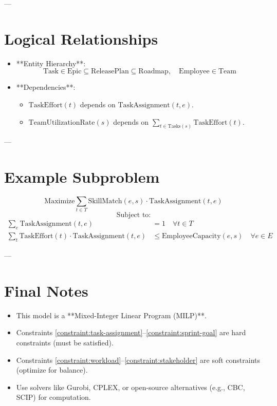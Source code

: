 \documentclass{article}
\begin{document}
---

\section{Logical Relationships}
\begin{itemize}
    \item **Entity Hierarchy**:
    $$
    \text{Task} \in \text{Epic} \subseteq \text{ReleasePlan} \subseteq \text{Roadmap}, \quad \text{Employee} \in \text{Team}
    $$
    \item **Dependencies**:
    \begin{itemize}
        \item $\text{TaskEffort}(t)$ depends on $\text{TaskAssignment}(t, e)$.
        \item $\text{TeamUtilizationRate}(s)$ depends on $\sum_{t \in \text{Tasks}(s)} \text{TaskEffort}(t)$.
    \end{itemize}
\end{itemize}

---

\section{Example Subproblem}
$$
\text{Maximize} \sum_{t \in T} \text{SkillMatch}(e, s) \cdot \text{TaskAssignment}(t, e)
$$
$$
\text{Subject to:}
$$
\begin{align}
\sum_{e} \text{TaskAssignment}(t, e) &= 1 \quad \forall t \in T \label{eq:sub-task-assignment} \\
\sum_{t} \text{TaskEffort}(t) \cdot \text{TaskAssignment}(t, e) &\leq \text{EmployeeCapacity}(e, s) \quad \forall e \in E \label{eq:sub-capacity}
\end{align}

---

\section{Final Notes}
\begin{itemize}
    \item This model is a **Mixed-Integer Linear Program (MILP)**.
    \item Constraints \ref{constraint:task-assignment}--\ref{constraint:sprint-goal} are hard constraints (must be satisfied).
    \item Constraints \ref{constraint:workload}--\ref{constraint:stakeholder} are soft constraints (optimize for balance).
    \item Use solvers like Gurobi, CPLEX, or open-source alternatives (e.g., CBC, SCIP) for computation.
\end{itemize}
\end{document}
